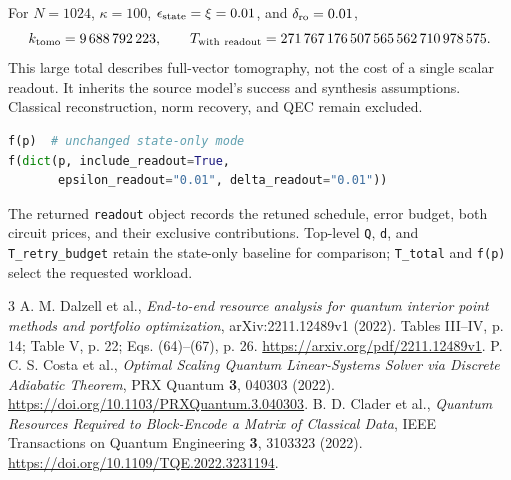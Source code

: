 \documentclass[11pt]{article}
\begin{document}
For $N=1024$, $\kappa=100$, $\epsilon_{\rm state}=\xi=0.01$, and $\delta_{\rm ro}=0.01$,
\[
 k_{\rm tomo}=9\,688\,792\,223,\qquad
 T_{\rm with\ readout}=271\,767\,176\,507\,565\,562\,710\,978\,575.
\]
This large total describes full-vector tomography, not the cost of a single scalar readout. It inherits the source model's success and synthesis assumptions. Classical reconstruction, norm recovery, and QEC remain excluded.
\begin{lstlisting}[language=Python]
f(p)  # unchanged state-only mode
f(dict(p, include_readout=True,
       epsilon_readout="0.01", delta_readout="0.01"))
\end{lstlisting}
The returned \texttt{readout} object records the retuned schedule, error budget, both circuit prices, and their exclusive contributions. Top-level \texttt{Q}, \texttt{d}, and \texttt{T\_retry\_budget} retain the state-only baseline for comparison; \texttt{T\_total} and \texttt{f(p)} select the requested workload.

\begin{thebibliography}{3}\small
{} A. M. Dalzell et al., \emph{End-to-end resource analysis for quantum interior point methods and portfolio optimization}, arXiv:2211.12489v1 (2022). Tables III--IV, p. 14; Table V, p. 22; Eqs. (64)--(67), p. 26. \url{https://arxiv.org/pdf/2211.12489v1}.
 P. C. S. Costa et al., \emph{Optimal Scaling Quantum Linear-Systems Solver via Discrete Adiabatic Theorem}, PRX Quantum \textbf{3}, 040303 (2022). \url{https://doi.org/10.1103/PRXQuantum.3.040303}.
 B. D. Clader et al., \emph{Quantum Resources Required to Block-Encode a Matrix of Classical Data}, IEEE Transactions on Quantum Engineering \textbf{3}, 3103323 (2022). \url{https://doi.org/10.1109/TQE.2022.3231194}.
\end{thebibliography}
\end{document}
